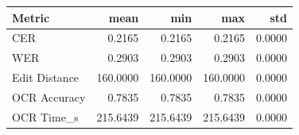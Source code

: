 \begin{tabular}{lrrrr}
\toprule
Metric & mean & min & max & std \\
\midrule
CER & 0.2165 & 0.2165 & 0.2165 & 0.0000 \\
WER & 0.2903 & 0.2903 & 0.2903 & 0.0000 \\
Edit Distance & 160.0000 & 160.0000 & 160.0000 & 0.0000 \\
OCR Accuracy & 0.7835 & 0.7835 & 0.7835 & 0.0000 \\
OCR Time_s & 215.6439 & 215.6439 & 215.6439 & 0.0000 \\
\bottomrule
\end{tabular}
